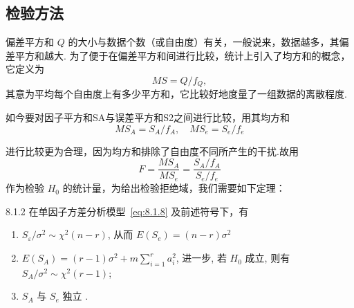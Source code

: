 \subsection{检验方法}

偏差平方和 $Q$ 的大小与数据个数（或自由度）有关，一般说来，数据越多，其偏差平方和越大. 为了便于在偏差平方和间进行比较，统计上引入了均方和的概念，它定义为 
\begin{equation*}
  MS=Q/f_Q,
\end{equation*}
其意为平均每个自由度上有多少平方和，它比较好地度量了一组数据的离散程度. 

如今要对因子平方和SA与误差平方和S2之间进行比较，用其均方和
\begin{equation*}
  MS_{A}=S_A / f_A, \quad MS_{e}=S_{e}/f_{e}
\end{equation*}


进行比较更为合理，因为均方和排除了自由度不同所产生的干扰.故用
\begin{equation}
  F = \frac{MS_{A}}{MS_{e}} = \frac{S_A/f_A}{S_e/f_e}
\end{equation}
作为检验 $H_0$ 的统计量，为给出检验拒绝域，我们需要如下定理：

\begin{theorem}{}{8.1.2}
  在单因子方差分析模型~\eqref{eq:8.1.8} 及前述符号下，有
  \begin{enumerate}
    \item $S_{\varepsilon} / \sigma^{2} \sim \chi^{2}(n-r)$, 从而 $E(S_{e})=(n-r) \sigma^{2}$ \label{enum:8.1.2.1}
    \item $E(S_{A})=(r-1) \sigma^{2} + m \sum\limits_{i=1}^{r} a_{i}^{2}$, 进一步, 若 $H_0$ 成立, 则有 $S_{A} / \sigma^{2} \sim \chi^{2}(r-1)$;\label{enum:8.1.2.2} 
    \item $S_A$ 与 $S_e$ 独立 \label{enum:8.1.2.3}.
  \end{enumerate}
\end{theorem}

